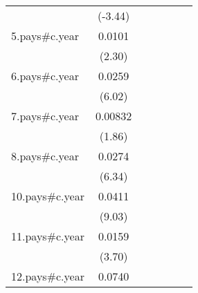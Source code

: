 {\begin{tabular}{l*{6}{c}}
                    &     (-3.44)         &                     &                     &                     &                     &                     \\
[1em]
5.pays#c.year       &      0.0101\sym{*}  &                     &                     &                     &                     &                     \\
                    &      (2.30)         &                     &                     &                     &                     &                     \\
[1em]
6.pays#c.year       &      0.0259\sym{***}&                     &                     &                     &                     &                     \\
                    &      (6.02)         &                     &                     &                     &                     &                     \\
[1em]
7.pays#c.year       &     0.00832         &                     &                     &                     &                     &                     \\
                    &      (1.86)         &                     &                     &                     &                     &                     \\
[1em]
8.pays#c.year       &      0.0274\sym{***}&                     &                     &                     &                     &                     \\
                    &      (6.34)         &                     &                     &                     &                     &                     \\
[1em]
10.pays#c.year      &      0.0411\sym{***}&                     &                     &                     &                     &                     \\
                    &      (9.03)         &                     &                     &                     &                     &                     \\
[1em]
11.pays#c.year      &      0.0159\sym{***}&                     &                     &                     &                     &                     \\
                    &      (3.70)         &                     &                     &                     &                     &                     \\
[1em]
12.pays#c.year      &      0.0740\sym{***}&                     &                     &                     &                     &                     \\

\end{tabular}}
